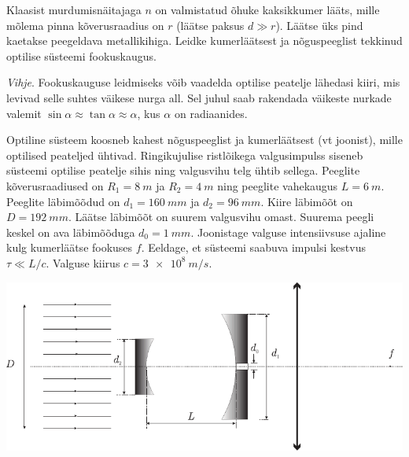 \documentclass[10pt]{article}
\begin{document}
{%

Klaasist murdumisnäitajaga $n$ on valmistatud õhuke kaksikkumer lääts, mille mõlema pinna kõverusraadius on $r$ (läätse paksus
$d \gg r$). Läätse üks pind kaetakse peegeldava metallikihiga. Leidke kumerläätsest ja nõguspeeglist tekkinud optilise süsteemi fookuskaugus. 

\emph{Vihje}. Fookuskauguse leidmiseks võib vaadelda optilise peatelje lähedasi kiiri, mis levivad
selle suhtes väikese nurga all. Sel juhul saab rakendada väikeste nurkade valemit $\sin \alpha \approx \tan \alpha \approx \alpha$, kus $\alpha$ on radiaanides.
\probend
\bigskip


Optiline süsteem koosneb kahest nõguspeeglist ja kumerläätsest (vt joonist), mille optilised peateljed ühtivad. Ringikujulise ristlõikega valgusimpulss siseneb süsteemi optilise peatelje sihis ning valgusvihu telg ühtib sellega. Peeglite kõverusraadiused on $R_1 = \SI{8}{m}$ ja $R_2 = \SI{4}{m}$ ning peeglite vahekaugus $L = \SI{6}{m}$. Peeglite läbimõõdud on $d_1 = \SI{160}{mm}$ ja $d_2 = \SI{96}{mm}$. Kiire läbimõõt on $D = \SI{192}{mm}$. Läätse läbimõõt on suurem valgusvihu omast. Suurema peegli keskel on ava läbimõõduga $d_0 = \SI{1}{mm}$. Joonistage valguse intensiivsuse ajaline kulg kumerläätse fookuses $f$. Eeldage, et süsteemi saabuva impulsi kestvus $\tau \ll L/c$. Valguse kiirus $c = \SI{3e8}{m/s}$.

\begin{center}
	\includegraphics[width=0.95\linewidth]{2006-v3g-09-yl}
\end{center}
\probend
\bigskip
\newpage\subsection{\protect{}}

}
\end{document}
